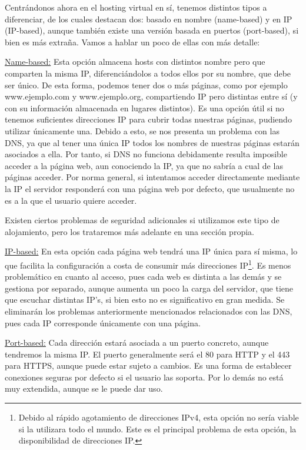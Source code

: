 \documentclass[a4paper, 10pt]{article} %
\begin{document}
Centrándonos ahora en el hosting virtual en sí, tenemos distintos tipos a diferenciar, de los cuales destacan dos: basado en nombre (name-based) y en IP (IP-based), aunque también existe una versión basada en puertos (port-based), si bien es más extraña. Vamos a hablar un poco de ellas con más detalle: 

\underline{Name-based:} Esta opción almacena hosts con distintos nombre pero que comparten la misma IP, diferenciándolos a todos ellos por su nombre, que debe ser único. De esta forma, podemos tener dos o más páginas, como por ejemplo www.ejemplo.com y www.ejemplo.org, compartiendo IP pero distintas entre sí (y con su información almacenada en lugares distintos). Es una opción útil si no tenemos suficientes direcciones IP para cubrir todas nuestras páginas, pudiendo utilizar únicamente una. Debido a esto, se nos presenta un problema con las DNS, ya que al tener una única IP todos los nombres de nuestras páginas estarán asociados a ella. Por tanto, si DNS no funciona debidamente resulta imposible acceder a la página web, aun conociendo la IP, ya que no sabría a cual de las páginas acceder. Por norma general, si intentamos acceder directamente mediante la IP el servidor responderá con una página web por defecto, que usualmente no es a la que el usuario quiere acceder. 

Existen ciertos problemas de seguridad adicionales si utilizamos este tipo de alojamiento, pero los trataremos más adelante en una sección propia. 

\underline{IP-based:} En esta opción cada página web tendrá una IP única para sí misma, lo que facilita la configuración a costa de consumir más direcciones IP\footnote{Debido al rápido agotamiento de direcciones IPv4, esta opción no sería viable si la utilizara todo el mundo. Este es el principal problema de esta opción, la disponibilidad de direcciones IP.}. Es menos problemático en cuanto al acceso, pues cada web es distinta a las demás y se gestiona por separado, aunque aumenta un poco la carga del servidor, que tiene que escuchar distintas IP's, si bien esto no es significativo en gran medida. Se eliminarán los problemas anteriormente mencionados relacionados con las DNS, pues cada IP corresponde únicamente con una página. 

\underline{Port-based:} Cada dirección estará asociada a un puerto concreto, aunque tendremos la misma IP. El puerto generalmente será el 80 para HTTP y el 443 para HTTPS, aunque puede estar sujeto a cambios. Es una forma de establecer conexiones seguras por defecto si el usuario las soporta. Por lo demás no está muy extendida, aunque se le puede dar uso. 
\end{document}
